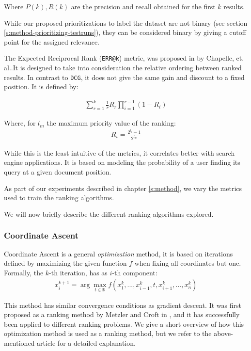 Where $P(k), R(k)$ are the precision and recall obtained for the first $k$ results.

While our proposed prioritizations to label the dataset are not binary (see section \ref{s:method-prioritizing-testruns}),
they can be considered binary by giving a cutoff point for the assigned relevance.

The Expected Reciprocal Rank (\texttt{ERR@k}) metric, was proposed in \cite{10.1145/1645953.1646033}
by Chapelle, et. al..It is designed to take into consideration the relative ordering between ranked results.
In contrast to \texttt{DCG}, it does not give the same gain and discount to a fixed position.
It is defined by:

\begin{align*}
\sum_{r=1}^k \frac{1}{r} R_r \prod_{i=1}^{r-1}(1-R_i)
\end{align*}

Where, for $l_m$ the maximum priority value of the ranking:
\begin{align*}
R_i = \frac{2^{l_i}-1}{2^{l_m}}
\end{align*}

While this is the least intuitive of the metrics, it correlates better with search engine applications.
It is based on modeling the probability of a user finding its query at a given document position.

As part of our experiments described in chapter \ref{s:method}, we vary the metrics
used to train the ranking algorithms. 

We will now briefly describe the different ranking algorithms explored.

\subsubsection{Coordinate Ascent}
Coordinate Ascent is a general \textit{optimization} method, it is based on iterations defined
by maximizing the given function $f$ when fixing all coordinates but one. Formally, the $k$-th iteration,
has as $i$-th component:
\begin{align*}
x^{k+1}_i = \arg \max_{t\in\mathbb{R}} f(x^{k}_1, ..., x^{k}_{i-1}, t, x^{k}_{i+1}, ..., x^k_n)
\end{align*}

This method has similar convergence conditions as gradient descent. It was first proposed as a
ranking method by Metzler and Croft in \cite{Metzler2006LinearFM}, and it has successfully been applied
to different ranking problems. We give a short overview of how this optimization method is used as
a ranking method, but we refer to the above-mentioned article for a detailed explanation.


